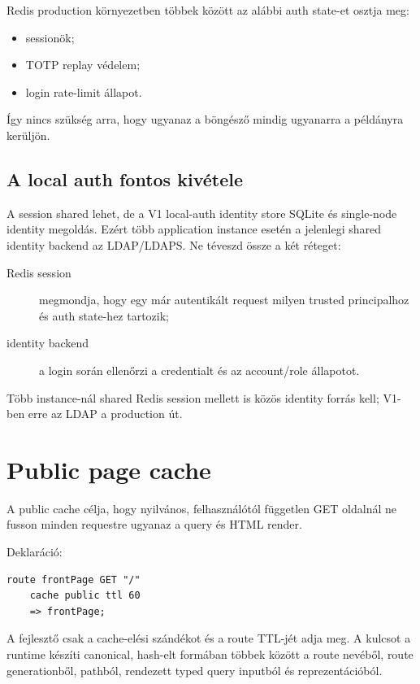 Redis production környezetben többek között az alábbi auth state-et osztja meg:

\begin{itemize}
  \item sessionök;
  \item TOTP replay védelem;
  \item login rate-limit állapot.
\end{itemize}

Így nincs szükség arra, hogy ugyanaz a böngésző mindig ugyanarra a példányra kerüljön.

\subsection*{A local auth fontos kivétele}

A session shared lehet, de a V1 local-auth identity store SQLite és single-node identity megoldás. Ezért több application instance esetén a jelenlegi shared identity backend az LDAP/LDAPS. Ne téveszd össze a két réteget:

\begin{description}
  \item[Redis session] megmondja, hogy egy már autentikált request milyen trusted principalhoz és auth state-hez tartozik;
  \item[identity backend] a login során ellenőrzi a credentialt és az account/role állapotot.
\end{description}

Több instance-nál shared Redis session mellett is közös identity forrás kell; V1-ben erre az LDAP a production út.

\section{Public page cache}

A public cache célja, hogy nyilvános, felhasználótól független GET oldalnál ne fusson minden requestre ugyanaz a query és HTML render.

Deklaráció:

\begin{lstlisting}[language=RWLang]
route frontPage GET "/"
    cache public ttl 60
    => frontPage;
\end{lstlisting}

A fejlesztő csak a cache-elési szándékot és a route TTL-jét adja meg. A kulcsot a runtime készíti canonical, hash-elt formában többek között a route nevéből, route generationből, pathból, rendezett typed query inputból és reprezentációból.

